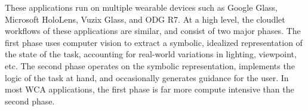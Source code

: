 These applications run on multiple wearable devices such as Google
Glass, Microsoft HoloLens, Vuzix Glass, and ODG R7. At a high level, 
the cloudlet workflows of these applications are similar, and consist of
two major phases.  The first phase uses computer vision
to extract a symbolic, idealized representation of the state of the
task, accounting for real-world variations in lighting, viewpoint,
etc.  The second phase operates on the symbolic representation,
implements the logic of the task at hand, and occasionally generates
guidance for the user.  In most WCA applications, the first phase is
far more compute intensive than the second phase.

